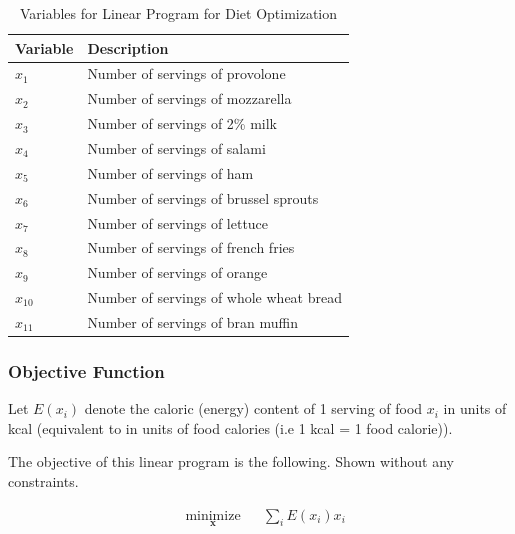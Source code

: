 \documentclass{article}
\begin{document}
    \begin{table}[H]
        \centering
        \begin{tabular}{@{}ll@{}}
        \toprule
        Variable & Description                             \\ \midrule
        $x_1$         & Number of servings of provolone         \\
        $x_2$         & Number of servings of mozzarella        \\
        $x_3$         & Number of servings of 2\% milk          \\
        $x_4$         & Number of servings of salami            \\
        $x_5$         & Number of servings of ham               \\
        $x_6$         & Number of servings of brussel sprouts   \\
        $x_7$         & Number of servings of lettuce           \\
        $x_8$         & Number of servings of french fries      \\
        $x_9$         & Number of servings of orange            \\
        $x_{10}$      & Number of servings of whole wheat bread \\
        $x_{11}$      & Number of servings of bran muffin       \\ \bottomrule
        \end{tabular}
        \caption{Variables for Linear Program for Diet Optimization}
        \label{tab:Q1_variables}
    \end{table}

    \subsubsection{Objective Function}

    Let $E(x_i)$ denote the caloric (energy) content of 1 serving of food $x_i$ in units of kcal (equivalent to in units of food calories (i.e 1 kcal = 1 food calorie)).

    The objective of this linear program is the following. Shown without any constraints.

    \begin{equation}
    \begin{aligned}
        & \underset{\mathbf{x}}{\text{minimize}} & & \sum_{i} E(x_i) x_i \\
    \end{aligned}
    \end{equation}
\end{document}
